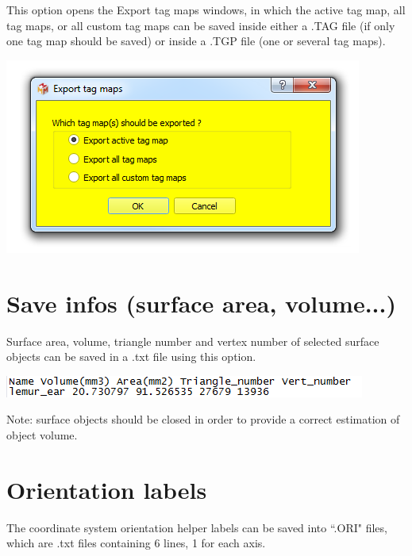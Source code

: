 \begin{minipage}{0.55\textwidth}
This option opens the Export tag maps windows, in which the active tag map, all tag maps, or all custom tag maps can be saved inside either a .TAG file (if only one tag map should be saved) or inside a .TGP file (one or several tag maps).


\end{minipage}  
 \begin{minipage}{0.45\textwidth}\centering
  \includegraphics[scale=0.5]{images/07/tagmaps/export.png}
 \end{minipage} 


\section{Save infos (surface area, volume...)}
\noindent
\begin{minipage}{0.55\textwidth}

Surface area, volume, triangle number and
vertex number of selected surface objects can be
saved in a .txt file using this option.
\end{minipage}  
 \begin{minipage}{0.45\textwidth}\centering
  \includegraphics[scale=0.4]{images/File/Infos.png}
 \end{minipage} 
\noindent

Note: surface objects should be closed in order to provide a correct estimation of object volume.
\section{Orientation labels}
The coordinate system orientation helper labels can be saved into ``.ORI" files, which are .txt files
containing 6 lines, 1 for each axis.


